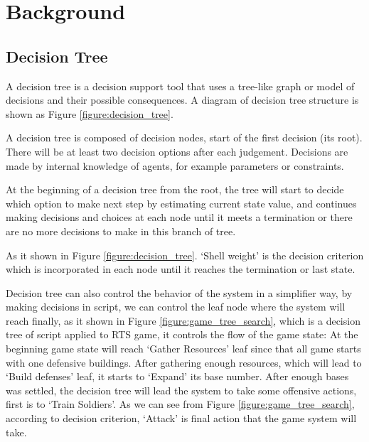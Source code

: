 \section{Background}

\subsection{Decision Tree}

A decision tree is a decision support tool that uses a tree-like graph or model of decisions and
their possible consequences. A diagram of decision tree structure is shown as Figure \ref{figure:decision_tree}. 

A decision tree is composed of decision nodes, start of the first decision (its root). There will be at least
two decision options after each judgement. Decisions are made by internal knowledge of agents, for example
parameters or constraints. 

At the beginning of a decision tree from the root, the tree will start to decide which option to make next
step by estimating current state value, and continues making decisions and choices at each node until it meets
a termination or there are no more decisions to make in this branch of tree. 

As it shown in Figure \ref{figure:decision_tree}. ‘Shell weight’ is the decision criterion which is incorporated in each
node until it reaches the termination or last state. 



Decision tree can also control the behavior of the system in a simplifier way, by making decisions in script,
we can control the leaf node where the system will reach finally, as it shown in Figure \ref{figure:game_tree_search},
which is a decision tree of script applied to RTS game\cite{barriga2018game}, it controls the flow of the game
state: At the beginning game state will reach ‘Gather Resources’ leaf since that all game starts with one
defensive buildings. After gathering enough resources, which will lead to ‘Build defenses’ leaf, it starts to
‘Expand’ its base number. After enough bases was settled, the decision tree will lead the system to take some
offensive actions, first is to ‘Train Soldiers’. As we can see from Figure \ref{figure:game_tree_search}, according
to decision criterion, ‘Attack’ is final action that the game system will take.



